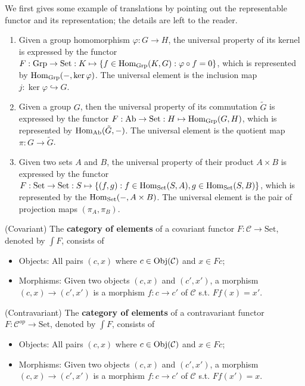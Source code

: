 \begin{example} We first gives some example of translations by pointing out the representable functor and its representation; the details are left to the reader.
	\begin{enumerate}[label=(\roman*)]
		\item Given a group homomorphism $\varphi:G\to H$, the universal property of its kernel is expressed by the functor $F:\mathrm{Grp}\to \mathrm{Set}:K\mapsto \{f\in\operatorname{Hom}_\mathrm{Grp}(K,G):\varphi\circ f=0\}$, which is represented by $\operatorname{Hom}_\mathrm{Grp}(-,\ker\varphi)$. The universal element is the inclusion map $j:\ker \varphi\hookrightarrow G$. 
		\item Given a group $G$, then the universal property of its commutation $\tilde G$ is expressed by the functor $F:\mathrm{Ab}\to \mathrm{Set}:H\mapsto \operatorname{Hom}_\mathrm{Grp}(G,H)$, which is represented by $\operatorname{Hom}_\mathrm{Ab}(\tilde G,-)$. The universal element is the quotient map $\pi:G\to \tilde G$.
		\item Given two sets $A$ and $B$, the universal property of their product $A\times B$ is expressed by the functor $F:\mathrm{Set}\to \mathrm{Set}:S\mapsto \{(f,g):f\in\operatorname{Hom}_\mathrm{Set}(S,A),g\in\operatorname{Hom}_\mathrm{Set}(S,B)\}$, which is represented by the $\operatorname{Hom}_\mathrm{Set}(-,A\times B)$. The universal element is the pair of projection maps $(\pi_A,\pi_B)$.
	\end{enumerate}
\end{example}
\begin{definition}
(Covariant) The \textbf{category of elements} of a covariant functor $F:\mathcal{C}\to \mathrm{Set}$, denoted by $\int F$, consists of 
	\begin{itemize}
		\item Objects: All pairs $(c,x)$ where $c\in\operatorname{Obj}(\mathcal{C})$ and $x\in Fc$;
		\item Morphisms: Given two objects $(c,x)$ and $(c',x')$, a morphism $(c,x)\to (c',x')$ is a morphism $f:c\to c'$ of $\mathcal{C}$ s.t. $Ff(x)=x'$.	
	\end{itemize}
(Contravariant) The \textbf{category of elements} of a contravariant functor $F:\mathcal{C}^{op}\to\mathrm{Set}$, denoted by $\int F$, consists of
	\begin{itemize}
		\item Objects: All pairs $(c,x)$ where $c\in \operatorname{Obj}(\mathcal{C})$ and $x\in Fc$;
		\item Morphisms: Given two objects $(c,x)$ and $(c',x')$, a morphism $(c,x)\to (c',x')$ is a morphism $f:c\to c'$ of $\mathcal{C}$ s.t. $Ff(x')=x$.
	\end{itemize}
\end{definition}
